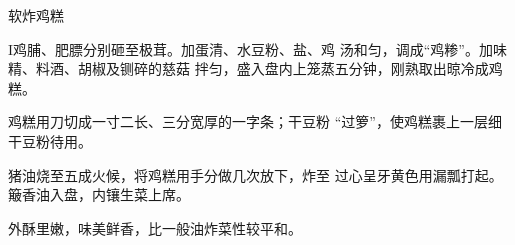 \begin{recipe}{软炸鸡糕}

\ingredients



\cooking

I鸡脯、肥膘分别砸至极茸。加蛋清、水豆粉、盐、鸡 汤和匀，调成“鸡糁”。加味精、料酒、胡椒及铡碎的慈菇 拌匀，盛入盘内上笼蒸五分钟，刚熟取出晾冷成鸡糕。

\step 鸡糕用刀切成一寸二长、三分宽厚的一字条；干豆粉 “过箩”，使鸡糕裹上一层细干豆粉待用。

\step 猪油烧至五成火候，将鸡糕用手分做几次放下，炸至 过心呈牙黄色用漏瓢打起。簸香油入盘，内镶生菜上席。

\notes

外酥里嫩，味美鲜香，比一般油炸菜性较平和。

\end{recipe}

